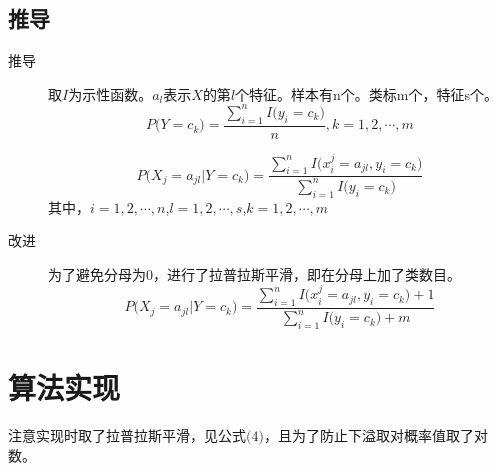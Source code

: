 \documentclass{ctexart}
\begin{document}
\subsection{推导}
\label{derivations}
\begin{description}
\item[推导]
取$I$为示性函数。$a_l$表示$X$的第$l$个特征。样本有n个。类标m个，特征s个。
\begin{equation}
P\big(Y=c_k\big)=\frac{\sum\limits_{i=1}^{n}I\big(y_i=c_k\big)}{n},k=1,2,\cdots,m
\end{equation}

\begin{equation}
P\big(X_j=a_{jl}|Y=c_k\big)=\frac{\sum\limits_{i=1}^{n}I\big(x_i^j=a_{jl},y_i=c_k\big)}{\sum\limits_{i=1}^{n}I\big(y_i=c_k\big)}
\end{equation}
其中，$i=1,2,\cdots,n$,$l=1,2,\cdots,s$,$k=1,2,\cdots,m$

\item[改进]
为了避免分母为0，进行了拉普拉斯平滑，即在分母上加了类数目。
\begin{equation}
P\big(X_j=a_{jl}|Y=c_k\big)=\frac{\sum\limits_{i=1}^{n}I\big(x_i^j=a_{jl},y_i=c_k\big)+1}{\sum\limits_{i=1}^{n}I\big(y_i=c_k\big)+m}
\end{equation}
\end{description}




\section{算法实现}
%
%
注意实现时取了拉普拉斯平滑，见公式$\big(4\big)$，且为了防止下溢取对概率值取了对数。\cite{nb:py,stanf:cs229}
%
\end{document}
